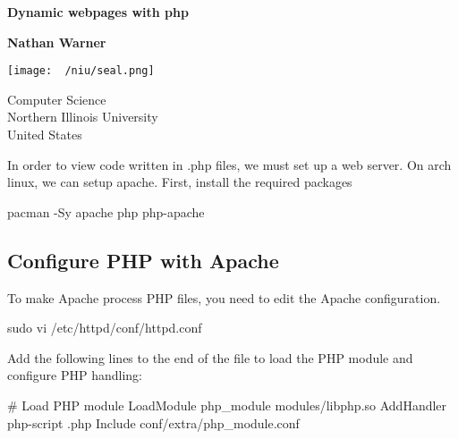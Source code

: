 \documentclass{report}
\title{\Huge{}}
\author{\huge{Nathan Warner}}
\date{\huge{}}
\begin{document}
        \begin{titlepage}
       \begin{center}
           \vspace*{1cm}
    
           \textbf{Dynamic webpages with php}
    
           \vspace{0.5cm}
            
                
           \vspace{1.5cm}
    
           \textbf{Nathan Warner}
    
           \vfill
                
                
           \vspace{0.8cm}
         
           \texttt{[image: ~/niu/seal.png]}
                
           Computer Science \\
           Northern Illinois University\\
           United States\\
           
                
       \end{center}
    \end{titlepage}
    \tableofcontents
    \pagebreak 
    \bigbreak \noindent 
    In order to view code written in .php files, we must set up a web server. On arch linux, we can setup apache. First, install the required packages
    \bigbreak \noindent 
    \begin{bashcode}
    pacman -Sy apache php php-apache
    \end{bashcode}

    \bigbreak \noindent 
    \subsection{Configure PHP with Apache}
    \bigbreak \noindent 
    To make Apache process PHP files, you need to edit the Apache configuration.
    \bigbreak \noindent 
    \begin{bashcode}
    sudo vi /etc/httpd/conf/httpd.conf
    \end{bashcode}
    \bigbreak \noindent 
    Add the following lines to the end of the file to load the PHP module and configure PHP handling:
    \bigbreak \noindent 
    \begin{bashcode}
        # Load PHP module
        LoadModule php_module modules/libphp.so
        AddHandler php-script .php
        Include conf/extra/php_module.conf
    \end{bashcode}
    \bigbreak \noindent 
\end{document}
